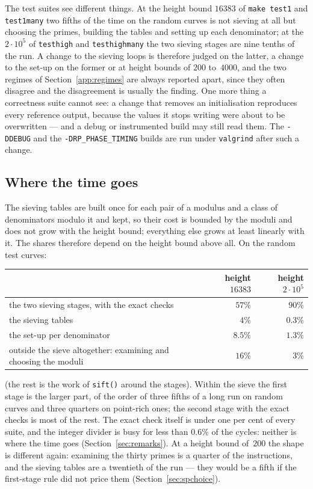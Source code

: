 \documentclass[12pt,a4paper,oneside]{amsart}
\begin{document}
The test suites see different things. At the height bound $16383$ of
\texttt{make test1} and \texttt{test1many} two fifths of the time on the
random curves is not sieving at all but choosing the primes, building the
tables and setting up each denominator; at the $2\cdot10^5$ of
\texttt{testhigh} and \texttt{testhighmany} the two sieving stages are nine
tenths of the run. A change to the sieving loops is therefore judged on the
latter, a change to the set-up on the former or at height bounds of $200$
to~$4000$, and the two regimes of Section~\ref{app:regimes} are always
reported apart, since they often disagree and the disagreement is usually
the finding. One more thing a correctness suite cannot see: a change that
removes an initialisation reproduces every reference output, because the
values it stops writing were about to be overwritten --- and a debug or
instrumented build may still read them. The \texttt{-DDEBUG} and the
\texttt{-DRP\_PHASE\_TIMING} builds are run under \texttt{valgrind} after
such a change.

\subsection{Where the time goes}\label{app:profile}

The sieving tables are built once for each pair of a modulus and a class
of denominators modulo it and kept, so their cost is bounded by the moduli
and does not grow with the height bound; everything else grows at least
linearly with it. The shares therefore depend on the height bound above
all. On the random test curves:
\begin{center}\small
\begin{tabular}{lrr}
 & height $16383$ & height $2\cdot10^5$ \\
\hline
the two sieving stages, with the exact checks & $57\%$ & $90\%$ \\
the sieving tables & $4\%$ & $0.3\%$ \\
the set-up per denominator & $8.5\%$ & $1.3\%$ \\
outside the sieve altogether: examining and choosing the moduli & $16\%$ & $3\%$ \\
\end{tabular}
\end{center}
(the rest is the work of \texttt{sift()} around the stages). Within the
sieve the first stage is the larger part, of the order of three fifths of a
long run on random curves and three quarters on point-rich ones; the second
stage with the exact checks is most of the rest. The exact check itself is
under one per cent of every suite, and the integer divider is busy for less
than $0.6\%$ of the cycles: neither is where the time goes
(Section~\ref{sec:remarks}). At a height bound of~$200$ the shape is
different again: examining the thirty primes is a quarter of the
instructions, and the sieving tables are a twentieth of the run --- they
would be a fifth if the first-stage rule did not price them
(Section~\ref{sec:spchoice}).
\end{document}

